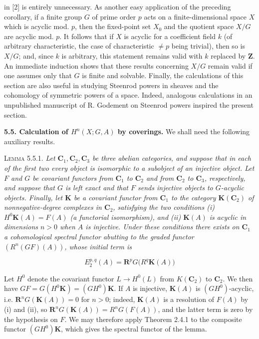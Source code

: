 \clearpage
{}

\noindent in [2] is entirely unnecessary. As another easy application of the
preceding corollary, if a finite group $G$ of prime order $p$ acts on a
finite-dimensional space $X$ which is acyclic mod. $p$, then the fixed-point
set $X_0$ and the quotient space $X/G$ are acyclic mod. $p$. It follows that
if $X$ is acyclic for a coefficient field $k$ (of arbitrary characteristic,
the case of characteristic $\ne p$ being trivial), then so is $X/G$; and,
since $k$ is arbitrary, this statement remains valid with $k$ replaced by
$\mathbf Z$. An immediate induction shows that these results concerning $X/G$
remain valid if one assumes only that $G$ is finite and solvable. Finally, the
calculations of this section are also useful in studying Steenrod powers in
sheaves and the cohomology of symmetric powers of a space. Indeed, analogous
calculations in an unpublished manuscript of R. Godement on Steenrod powers
inspired the present section.

\bigskip
\textbf{5.5. Calculation of $H^n(X;G,A)$ by coverings.} We shall
need the following auxiliary results.

\textsc{Lemma 5.5.1.} \textit{Let ${\mathbf C}_1,{\mathbf C}_2,{\mathbf C}_3$ be three abelian
categories, and suppose that in each of the first two every object is
isomorphic to a subobject of an injective object. Let $F$ and $G$ be covariant
functors from ${\mathbf C}_1$ to ${\mathbf C}_2$ and from ${\mathbf C}_2$ to ${\mathbf C}_3$, respectively, and
suppose that $G$ is left exact and that $F$ sends injective objects to $G$-acyclic objects. Finally, let
$\mathbf K$ be a covariant functor from ${\mathbf C}_1$ to the category
$\mathbf K({\mathbf C}_2)$ of nonnegative-degree complexes in ${\mathbf C}_2$, satisfying the two
conditions \textup{(i)} $H^0\mathbf K(A)=F(A)$ (a functorial isomorphism), and \textup{(ii)}
$\mathbf K(A)$ is acyclic in dimensions $n>0$ when $A$ is injective. Under
these conditions there exists on ${\mathbf C}_1$ a cohomological spectral functor
abutting to the graded functor $(R^n(GF)(A))$, whose initial term is}

\[
\tag{5.5.1}
E_2^{p,q}(A)={\mathbf R}^pG\bigl(R^q\mathbf K(A)\bigr)
\]

Let $H^0$ denote the covariant functor $L\to H^0(L)$ from
$K({\mathbf C}_2)$ to ${\mathbf C}_2$. We then have
$GF=G(H^0\mathbf K)=(GH^0)\mathbf K$. If $A$ is injective, $\mathbf K(A)$ is
$(GH^0)$-acyclic, i.e. ${\mathbf R}^nG(\mathbf K(A))=0$ for $n>0$; indeed,
$\mathbf K(A)$ is a resolution of $F(A)$ by (i) and (ii), so
${\mathbf R}^nG(\mathbf K(A))=R^nG(F(A))$, and the latter term is zero by the hypothesis
on $F$. We may therefore apply Theorem 2.4.1 to the composite functor
$(GH^0)\mathbf K$, which gives the spectral functor of the lemma.

